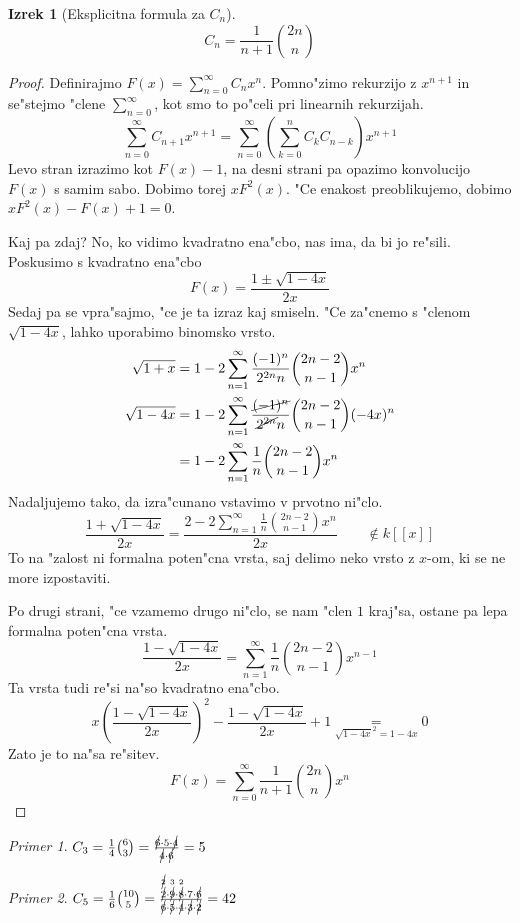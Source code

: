 \documentclass[a4paper,12pt]{article}
\theoremstyle{definition}
\newtheorem{theorem}[counter]{Izrek}
\theoremstyle{remark}
\newtheorem*{ex}{Primer}
\begin{document}
\begin{theorem}[Eksplicitna formula za $C_n$]
	\[C_n = \frac{1}{n + 1} \binom{2n}{n}\]
\end{theorem}
\begin{proof}
	Definirajmo $F(x) = \sum_{n = 0}^{\infty} C_n x^n$.
	Pomno"zimo rekurzijo z $x^{n + 1}$ in se"stejmo "clene $\sum_{n = 0}^{\infty}$, kot smo to po"celi pri linearnih rekurzijah.
	\[\sum_{n = 0}^{\infty} C_{n + 1} x^{n + 1} = \sum_{n = 0}^{\infty} (\sum_{k = 0}^{n} C_k C_{n-k}) x^{n + 1}\]
	Levo stran izrazimo kot $F(x) - 1$, na desni strani pa opazimo konvolucijo $F(x)$ s samim sabo. Dobimo torej $x F^2(x)$. "Ce enakost preoblikujemo, dobimo $x F^2(x) - F(x) + 1 = 0$.

	Kaj pa zdaj? No, ko vidimo kvadratno ena"cbo, nas ima, da bi jo re"sili. Poskusimo s kvadratno ena"cbo
	\[F(x) = \frac{1 \pm \sqrt{1 - 4x}}{2x}\]
	Sedaj pa se vpra"sajmo, "ce je ta izraz kaj smiseln. "Ce za"cnemo s "clenom $\sqrt{1-4x}$, lahko uporabimo binomsko vrsto.
	\begin{align*}
		\sqrt{1 + x} &= 1 - 2\sum_{n = 1}^{\infty} \frac{(-1)^n}{2^{2n}n} \binom{2n - 2}{n - 1} x^n\\
		\sqrt{1 - 4x} &= 1 - 2\sum_{n = 1}^{\infty} \frac{\cancel{(-1)^n}}{\cancel{2^{2n}}n} \binom{2n - 2}{n - 1} (-4x)^n\\
		&= 1 - 2\sum_{n = 1}^{\infty} \frac{1}{n} \binom{2n - 2}{n - 1} x^n
	\end{align*}
	Nadaljujemo tako, da izra"cunano vstavimo v prvotno ni"clo.
	\[\frac{1 + \sqrt{1 - 4x}}{2x} = \frac{2 - 2\sum_{n = 1}^{\infty} \frac{1}{n} \binom{2n - 2}{n - 1} x^n}{2x} \qquad \notin k[[x]] \]
	To na "zalost ni formalna poten"cna vrsta, saj delimo neko vrsto z $x$-om, ki se ne more izpostaviti.

	Po drugi strani, "ce vzamemo drugo ni"clo, se nam "clen $1$ kraj"sa, ostane pa lepa formalna poten"cna vrsta.
	\[\frac{1 - \sqrt{1 - 4x}}{2x} = \sum_{n = 1}^{\infty} \frac{1}{n} \binom{2n - 2}{n - 1} x^{n - 1}\]
	Ta vrsta tudi re"si na"so kvadratno ena"cbo.
	\[x (\frac{1 - \sqrt{1 - 4x}}{2x})^2 - \frac{1 - \sqrt{1 - 4x}}{2x} + 1 \underset{\sqrt{1 - 4x}^2 = 1 - 4x}{=} 0\]
	Zato je to na"sa re"sitev.
	\[F(x) = \sum_{n = 0}^{\infty} \frac{1}{n + 1} \binom{2n}{n} x^n\]
\end{proof}

\begin{ex}
	$C_3 = \frac{1}{4} \binom{6}{3} = \frac{\cancel{6} \cdot 5 \cdot \cancel{4}}{\cancel{4} \cdot \cancel{6}} = 5$
\end{ex}
\begin{ex}
	$C_5 = \frac{1}{6} \binom{10}{5} = \frac{\overset{\cancel{2}}{\cancel{2}} \cdot \overset{3}{\cancel{9}} \cdot \overset{2}{\cancel{8}} \cdot 7 \cdot \cancel{6}}{\cancel{6} \cdot \cancel{5} \cdot \cancel{4} \cdot \cancel{3} \cdot \cancel{2}} = 42$
\end{ex}
\end{document}
